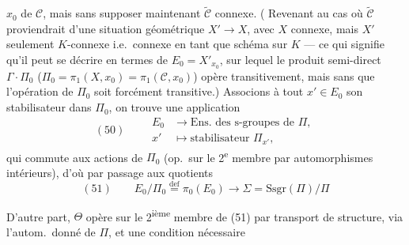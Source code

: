 \documentclass[11pt,a4paper]{article}
\begin{document}

$x_0$ de $\mathcal{C}$, mais sans supposer maintenant $\tilde{\mathcal{C}}$ connexe. (\struck{\ill{}} Revenant au cas où $\tilde{\mathcal{C}}$ proviendrait d'une situation géométrique $X' \to X$, avec $X$ connexe,  mais $X'$ \struck{\ill{}} seulement $K$-connexe i.e.\ connexe en tant que schéma sur $K$ --- ce qui signifie qu'il peut se décrire en termes de $E_0 = X'_{x_0}$, sur lequel le produit semi-direct $\Gamma \cdot \Pi_0$ ($\Pi_0 = \pi_1(X, x_0) = \pi_1(\mathcal{C}, x_0)$) opère transitivement, mais sans que l'opération de $\Pi_0$ soit forcément transitive.) Associons à tout $x' \in E_0$ son stabilisateur dans $\Pi_0$, on trouve une application
\[
  (50) \qquad
  \begin{aligned}
    E_0 &\longrightarrow \text{Ens.\ des s-groupes de } \Pi, \\
    x' &\longmapsto \text{stabilisateur } \Pi_{x'},
  \end{aligned}
\]
qui commute aux actions de $\Pi_0$ (op.\ sur le 2\textsuperscript{e} membre par automorphismes intérieurs), d'où par passage aux quotients
\[
  (51) \qquad E_0/\Pi_0 \overset{\mathrm{def}}{=} \pi_0(E_0) \longrightarrow \Sigma = \mathrm{Ssgr}(\Pi)/\Pi
\]

D'autre part, $\Theta$ opère sur le 2\textsuperscript{ième} membre de (51) par transport de structure, via l'autom.\ donné de $\Pi$, et \struck{\ill{}} une condition nécessaire
\end{document}
